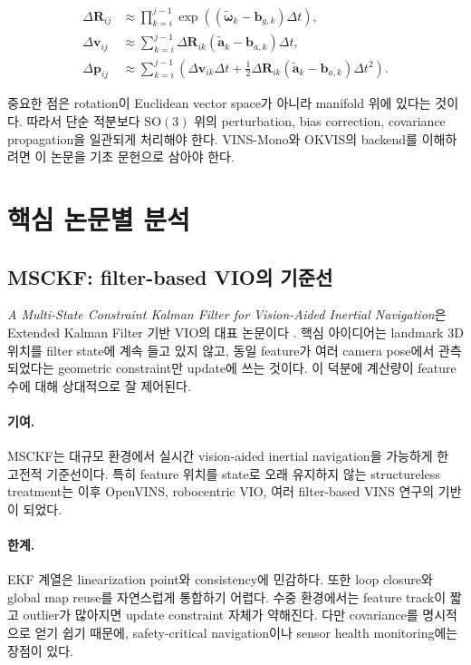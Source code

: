 \documentclass[11pt,a4paper]{article}
\newcommand{\SO}{\mathrm{SO}(3)}
\newcommand{\paper}[1]{\textit{#1}}
\begin{document}
\begin{align}
\Delta \mathbf{R}_{ij} &\approx \prod_{k=i}^{j-1}
\exp\left((\tilde{\boldsymbol{\omega}}_k-\mathbf{b}_{g,k})\Delta t\right), \\
\Delta \mathbf{v}_{ij} &\approx \sum_{k=i}^{j-1}
\Delta \mathbf{R}_{ik}(\tilde{\mathbf{a}}_k-\mathbf{b}_{a,k})\Delta t, \\
\Delta \mathbf{p}_{ij} &\approx \sum_{k=i}^{j-1}
\left(\Delta \mathbf{v}_{ik}\Delta t
+ \frac{1}{2}\Delta \mathbf{R}_{ik}(\tilde{\mathbf{a}}_k-\mathbf{b}_{a,k})\Delta t^2\right).
\end{align}

중요한 점은 rotation이 Euclidean vector space가 아니라 manifold 위에 있다는 것이다.
따라서 단순 적분보다 \(\SO\) 위의 perturbation, bias correction, covariance propagation을 일관되게 처리해야 한다.
VINS-Mono와 OKVIS의 backend를 이해하려면 이 논문을 기초 문헌으로 삼아야 한다.

\section{핵심 논문별 분석}

\subsection{MSCKF: filter-based VIO의 기준선}

\paper{A Multi-State Constraint Kalman Filter for Vision-Aided Inertial Navigation}은 Extended Kalman Filter 기반 VIO의 대표 논문이다 \cite{mourikis2007msckf}.
핵심 아이디어는 landmark 3D 위치를 filter state에 계속 들고 있지 않고, 동일 feature가 여러 camera pose에서 관측되었다는 geometric constraint만 update에 쓰는 것이다.
이 덕분에 계산량이 feature 수에 대해 상대적으로 잘 제어된다.

\paragraph{기여.}
MSCKF는 대규모 환경에서 실시간 vision-aided inertial navigation을 가능하게 한 고전적 기준선이다.
특히 feature 위치를 state로 오래 유지하지 않는 structureless treatment는 이후 OpenVINS, robocentric VIO, 여러 filter-based VINS 연구의 기반이 되었다.

\paragraph{한계.}
EKF 계열은 linearization point와 consistency에 민감하다.
또한 loop closure와 global map reuse를 자연스럽게 통합하기 어렵다.
수중 환경에서는 feature track이 짧고 outlier가 많아지면 update constraint 자체가 약해진다.
다만 covariance를 명시적으로 얻기 쉽기 때문에, safety-critical navigation이나 sensor health monitoring에는 장점이 있다.
\end{document}
